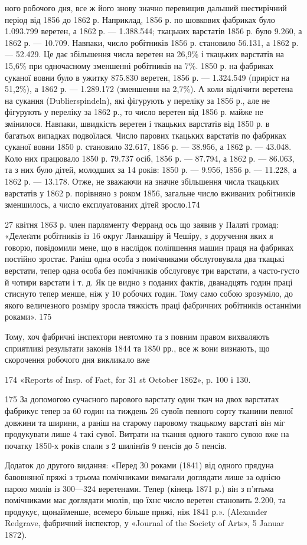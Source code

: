 ного робочого дня, все ж його знову значно перевищив дальший
шестирічний період від 1856 до 1862 р. Наприклад, 1856 р. по
шовкових фабриках було 1.093.799 веретен, а 1862 р. — 1.388.544;
ткацьких варстатів 1856 р. було 9.260, а 1862 р. — 10.709. Навпаки,
число робітників 1856 р. становило 56.131, а 1862 р. — 52.429.
Це дає збільшення числа веретен на 26,9\% і ткацьких варстатів
на 15,6\% при одночасному зменшенні робітників на 7\%. 1850 р. на
фабриках суканої вовни було в ужитку 875.830 веретен, 1856 р. —
1.324.549 (приріст на 51,2\%), а 1862 р. — 1.289.172 (зменшення
на 2,7\%). А коли відлічити веретена на сукання (Dublierspindeln),
які фігурують у переліку за 1856 р., але не фігурують у переліку
за 1862 р., то число веретен від 1856 р. майже не змінилося. Навпаки,
швидкість веретен і ткацьких варстатів від 1850 р. в
багатьох випадках подвоїлася. Число парових ткацьких варстатів
по фабриках суканої вовни 1850 р. становило 32.617,
1856 р. — 38.956, а 1862 р. — 43.048. Коло них працювало 1850 р.
79.737 осіб, 1856 р. — 87.794, а 1862 р. — 86.063, та з них було
дітей, молодших за 14 років: 1850 р. — 9.956, 1856 р. — 11.228,
а 1862 р. — 13.178. Отже, не зважаючи на значне збільшення
числа ткацьких варстатів у 1862 р. порівняно з роком 1856, загальне
число вживаних робітників зменшилось, а число експлуатованих
дітей зросло.174

27 квітня 1863 р. член парляменту Ферранд ось що заявив у
Палаті громад: «Делеґати робітників із 16 округ Ланкашіру й
Чешіру, з доручення яких я говорю, повідомили мене, що в наслідок
поліпшення машин праця на фабриках постійно зростає.
Раніш одна особа з помічниками обслуговувала два ткацькі верстати,
тепер одна особа без помічників обслуговує три варстати,
а часто-густо й чотири варстати і т. д. Як це видно з поданих
фактів, дванадцять годин праці стиснуто тепер менше, ніж у
10 робочих годин. Тому само собою зрозуміло, до якого величезного
розміру зросла тяжкість праці фабричних робітників останніми
роками». 175

Тому, хоч фабричні інспектори невтомно та з повним правом
вихваляють сприятливі результати законів 1844 та 1850 рр.,
все ж вони визнають, що скорочення робочого дня викликало вже

174 «Reports of Insp. of Fact, for 31 st October 1862», p. 100 і 130.

175 За допомогою сучасного парового варстату один ткач на двох
варстатах фабрикує тепер за 60 годин на тиждень 26 сувоїв певного сорту
тканини певної довжини та ширини, а раніш на старому паровому ткацькому
варстаті він міг продукувати лише 4 такі сувої. Витрати на ткання
одного такого сувою вже на початку 1850-х років спали з 2 шилінґів
9 пенсів до 5 пенсів.

Додаток до другого видання: «Перед З0 роками (1841) від одного прядуна
бавовняної пряжі з трьома помічниками вимагали доглядати лише
за однією парою мюлів із 300—324 веретенами. Тепер (кінець 1871 р.)
він з п’ятьма помічниками має доглядати мюлів, що їхнє число веретен
становить 2.200, та продукує, щонайменше, всемеро більше пряжі, ніж
1841 р.». (Alexander Redgrave, фабричний інспектор, у «Journal of
the Society of Arts», 5 Januar 1872).
